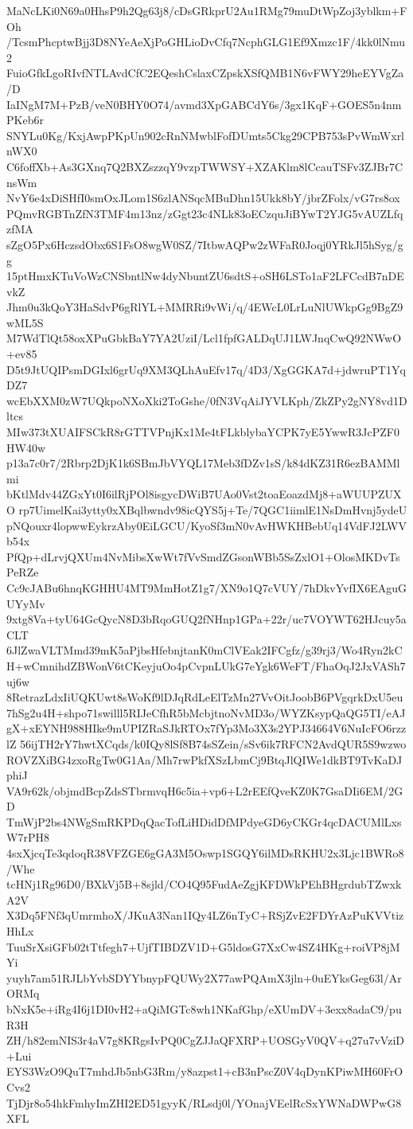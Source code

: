 MaNcLKi0N69a0HhsP9h2Qg63j8/cDsGRkprU2Au1RMg79muDtWpZoj3yblkm+FOh
/TcsmPhcptwBjj3D8NYeAeXjPoGHLioDvCfq7NcphGLG1Ef9Xmzc1F/4kk0lNmu2
FuioGfkLgoRIvfNTLAvdCfC2EQeshCslaxCZpskXSfQMB1N6vFWY29heEYVgZa/D
IaINgM7M+PzB/veN0BHY0O74/avmd3XpGABCdY6s/3gx1KqF+GOES5n4nmPKeb6r
SNYLu0Kg/KxjAwpPKpUn902cRnNMwblFofDUmts5Ckg29CPB753sPvWmWxrlnWX0
C6foffXb+As3GXnq7Q2BXZszzqY9vzpTWWSY+XZAKlm8lCcauTSFv3ZJBr7CnsWm
NvY6e4xDiSHfI0smOxJLom1S6zlANSqcMBuDhn15Ukk8bY/jbrZFolx/vG7rs8ox
PQmvRGBTnZfN3TMF4m13nz/zGgt23c4NLk83oECzquJiBYwT2YJG5vAUZLfqzfMA
sZgO5Px6HczsdObx6S1FsO8wgW0SZ/7ItbwAQPw2zWFaR0Joqj0YRkJl5hSyg/gg
15ptHmxKTuVoWzCNSbntlNw4dyNbuntZU6sdtS+oSH6LSTo1aF2LFCcdB7nDEvkZ
Jhm0u3kQoY3HaSdvP6gRlYL+MMRRi9vWi/q/4EWcL0LrLuNlUWkpGg9BgZ9wML5S
M7WdTlQt58oxXPuGbkBaY7YA2UziI/Lcl1fpfGALDqUJ1LWJnqCwQ92NWwO+ev85
D5t9JtUQIPsmDGIxl6grUq9XM3QLhAuEfv17q/4D3/XgGGKA7d+jdwruPT1YqDZ7
wcEbXXM0zW7UQkpoNXoXki2ToGshe/0fN3VqAiJYVLKph/ZkZPy2gNY8vd1Dltcs
MIw373tXUAIFSCkR8rGTTVPnjKx1Me4tFLkblybaYCPK7yE5YwwR3JcPZF0HW40w
p13a7c0r7/2Rbrp2DjK1k6SBmJbVYQL17Meb3fDZv1sS/k84dKZ31R6ezBAMMlmi
bKtlMdv44ZGxYt0I6ilRjPOl8isgycDWiB7UAo0Vst2toaEoazdMj8+aWUUPZUXO
rp7UimelKai3ytty0xXBqlbwndv98icQYS5j+Te/7QGC1iimlE1NsDmHvnj5ydeU
pNQouxr4lopwwEykrzAby0EiLGCU/KyoSf3mN0vAvHWKHBebUq14VdFJ2LWVb54x
PfQp+dLrvjQXUm4NvMibsXwWt7fVvSmdZGsonWBb5SsZxlO1+OlosMKDvTsPeRZe
Cc9cJABu6hnqKGHHU4MT9MmHotZ1g7/XN9o1Q7cVUY/7hDkvYvfIX6EAguGUYyMv
9xtg8Va+tyU64GcQycN8D3bRqoGUQ2fNHnp1GPa+22r/uc7VOYWT62HJcuy5aCLT
6JlZwaVLTMmd39mK5aPjbsHfebnjtanK0mClVEak2IFCgfz/g39rj3/Wo4Ryn2kC
H+wCmnihdZBWonV6tCKeyjuOo4pCvpnLUkG7eYgk6WeFT/FhaOqJ2JxVASh7uj6w
8RetrazLdxIiUQKUwt8sWoKf9lDJqRdLeElTzMn27VvOitJoobB6PVgqrkDxU5eu
7hSg2u4H+shpo71swilll5RIJeCfhR5bMcbjtnoNvMD3o/WYZKsypQaQG5TI/eAJ
gX+xEYNH988HIke9mUPIZRaSJkRTOx7fYp3Mo3X3s2YPJ34664V6NuIcFO6rzzlZ
56ijTH2rY7hwtXCqds/k0IQy8lSf8B74sSZein/sSv6ik7RFCN2AvdQUR5S9wzwo
ROVZXiBG4zxoRgTw0G1Aa/Mh7rwPkfXSzLbmCj9BtqJlQIWe1dkBT9TvKaDJphiJ
VA9r62k/objmdBcpZdsSTbrmvqH6c5ia+vp6+L2rEEfQveKZ0K7GsaDIi6EM/2GD
TmWjP2bs4NWgSmRKPDqQacTofLiHDidDfMPdyeGD6yCKGr4qcDACUMlLxsW7rPH8
4sxXjcqTe3qdoqR38VFZGE6gGA3M5Oswp1SGQY6ilMDsRKHU2x3Ljc1BWRo8/Whe
tcHNj1Rg96D0/BXkVj5B+8sjld/CO4Q95FudAeZgjKFDWkPEhBHgrdubTZwxkA2V
X3Dq5FNf3qUmrmhoX/JKuA3Nan1IQy4LZ6nTyC+RSjZvE2FDYrAzPuKVVtizHhLx
TuuSrXsiGFb02tTtfegh7+UjfTIBDZV1D+G5ldosG7XxCw4SZ4HKg+roiVP8jMYi
yuyh7am51RJLbYvbSDYYbnypFQUWy2X77awPQAmX3jln+0uEYksGeg63l/ArORMq
bNxK5e+iRg4I6j1DI0vH2+aQiMGTc8wh1NKafGhp/eXUmDV+3exx8adaC9/puR3H
ZH/h82emNIS3r4aV7g8KRgsIvPQ0CgZJJaQFXRP+UOSGyV0QV+q27u7vVziD+Lui
EYS3WzO9QuT7mhdJb5nbG3Rm/y8azpst1+cB3nPscZ0V4qDynKPiwMH60FrOCvs2
TjDjr8o54hkFmhyImZHI2ED51gyyK/RLsdj0l/YOnajVEelRcSxYWNaDWPwG8XFL
